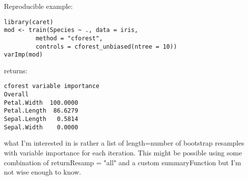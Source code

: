 \documentclass[caret-main.tex]{subfiles}
\begin{document}
Reproducible example:
\begin{verbatim}
library(caret)
mod <- train(Species ~ ., data = iris,
         method = "cforest",
         controls = cforest_unbiased(ntree = 10))
varImp(mod)
\end{verbatim}
returns:
\begin{verbatim}
cforest variable importance
Overall
Petal.Width  100.0000
Petal.Length  86.6279
Sepal.Length   0.5814
Sepal.Width    0.0000 
\end{verbatim}
what I'm interested in is rather a list of length=number of bootstrap resamples with variable importance for each iteration. This might be possible using some combination of returnResamp = "all" and a custom summaryFunction but I'm not wise enough to know.
\end{document}
